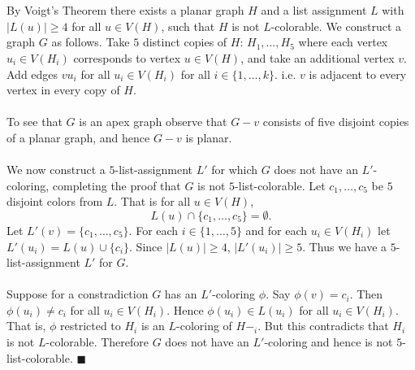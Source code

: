 \documentclass[letterpaper,12pt,oneside,onecolumn]{article}
\begin{document}
\section{}
\paragraph{}
By Voigt's Theorem there exists a planar graph $H$ and a list assignment $L$ with $|L(u)| \geq 4$ for all $u \in V(H)$, such that $H$ is not $L$-colorable. We construct a graph $G$ as follows. Take $5$ distinct copies of $H$: $H_1, \dots, H_5$ where each vertex $u_i \in V(H_i)$ corresponds to vertex $u \in V(H)$, and take an additional vertex $v$. Add edges $vu_i$ for all $u_i \in V(H_i)$ for all $i \in \{1,\dots, k\}$. i.e. $v$ is adjacent to every vertex in every copy of $H$.
\paragraph{}
To see that $G$ is an apex graph observe that $G-v$ consists of five disjoint copies of a planar graph, and hence $G-v$ is planar.
\paragraph{}
We now construct a $5$-list-assignment $L'$ for which $G$ does not have an $L'$-coloring, completing the proof that $G$ is not $5$-list-colorable. Let $c_1, \dots, c_5$ be $5$ disjoint colors from $L$. That is for all $u \in V(H)$, $$L(u) \cap \{c_1, \dots, c_5\} = \emptyset.$$
Let $L'(v) = \{c_1, \dots, c_5\}$. For each $i \in \{1, \dots, 5\}$ and for each $u_i \in V(H_i)$ let $L'(u_i) = L(u) \cup \{c_i\}$. Since $|L(u)| \geq 4$, $|L'(u_i)|\geq 5$. Thus we have a $5$-list-assignment $L'$ for $G$.
\paragraph{}
Suppose for a constradiction $G$ has an $L'$-coloring $\phi$. Say $\phi(v) = c_i$. Then $\phi(u_i) \neq c_i$ for all $u_i \in V(H_i)$. Hence $\phi(u_i) \in L(u_i)$ for all $u_i \in V(H_i)$. That is, $\phi$ restricted to $H_i$ is an $L$-coloring of $H-_i$. But this contradicts that $H_i$ is not $L$-colorable. Therefore $G$ does not have an $L'$-coloring and hence is not $5$-list-colorable. $\blacksquare$

\newpage
\section{}
\end{document}
